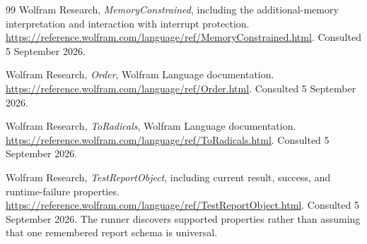 \documentclass[11pt,letterpaper]{article}
\theoremstyle{definition}
\theoremstyle{remark}
\begin{document}
\begin{thebibliography}{99}
Wolfram Research, \emph{MemoryConstrained}, including the additional-memory
interpretation and interaction with interrupt protection.
\url{https://reference.wolfram.com/language/ref/MemoryConstrained.html}.
Consulted 5 September 2026.

Wolfram Research, \emph{Order}, Wolfram Language documentation.
\url{https://reference.wolfram.com/language/ref/Order.html}.
Consulted 5 September 2026.

Wolfram Research, \emph{ToRadicals}, Wolfram Language documentation.
\url{https://reference.wolfram.com/language/ref/ToRadicals.html}.
Consulted 5 September 2026.

Wolfram Research, \emph{TestReportObject}, including current result,
success, and runtime-failure properties.
\url{https://reference.wolfram.com/language/ref/TestReportObject.html}.
Consulted 5 September 2026. The runner discovers supported properties rather
than assuming that one remembered report schema is universal.

\end{thebibliography}
\endgroup
\end{document}
